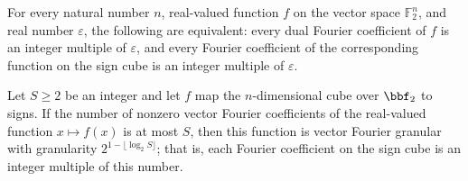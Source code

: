 \begin{theorem}
\label{FABL.isDualFourierGranular_iff_isVectorFourierGranular}
\leanok
{}
For every natural number $n$, real-valued function $f$ on the vector space $\mathbb
F_2^n$, and real number $\varepsilon$, the following are equivalent: every dual Fourier
coefficient of $f$ is an integer multiple of $\varepsilon$, and every Fourier
coefficient of the corresponding function on the sign cube is an integer multiple of
$\varepsilon$.
\end{theorem}

\begin{theorem}
\label{FABL.isVectorFourierGranular_signValue_of_spectralSparsity_le}
\leanok
{}
Let $S\ge 2$ be an integer and let $f$ map the $n$-dimensional cube over $\bbf_2$ to
signs. If the number of nonzero vector Fourier coefficients of the real-valued function
$x\mapsto f(x)$ is at most $S$, then this function is vector Fourier granular with
granularity $2^{1-\lfloor\log_2 S\rfloor}$; that is, each Fourier coefficient on the
sign cube is an integer multiple of this number.
\end{theorem}

